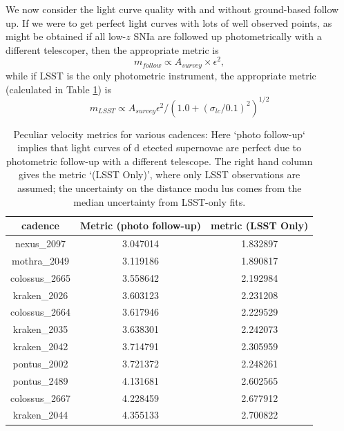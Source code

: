 \documentclass[a4paper,10pt]{article}
\begin{document}
We now consider the light curve quality with and without ground-based follow up.
If we were to get perfect light curves with lots of well observed points, as might be obtained if all low-$z$ SNIa are followed up photometrically with a different telescoper, then the appropriate metric is 
\begin{equation}
    m_{follow} \propto A_{survey} \times \epsilon^2,
\end{equation}
while if LSST is the only photometric instrument, the appropriate metric (calculated in Table \ref{tab:cadence_metrics}) is
\begin{equation}
    m_{LSST} \propto A_{survey} \epsilon^2 /(1.0 + \left(\sigma_{lc}/0.1\right)^2)^{1/2}
\end{equation}



\begin{table}
\begin{center}
\begin{tabular}{|c|c|c|}
    \hline
     cadence &  Metric (photo follow-up) &  metric (LSST Only) \\
     \hline
	nexus\_2097 & 3.047014 & 1.832897  \\
	mothra\_2049 & 3.119186 & 1.890817  \\
	colossus\_2665 & 3.558642 & 2.192984  \\
	kraken\_2026 & 3.603123 & 2.231208  \\
	colossus\_2664 & 3.617946 & 2.229529  \\	
	kraken\_2035 & 3.638301 & 2.242073  \\
	kraken\_2042 & 3.714791 & 2.305959  \\
	pontus\_2002 & 3.721372 & 2.248261  \\
	pontus\_2489 & 4.131681 & 2.602565  \\
	colossus\_2667 & 4.228459 & 2.677912  \\
	kraken\_2044 & 4.355133 & 2.700822  \\
     \hline
\end{tabular}
\end{center}
\caption{Peculiar velocity metrics for various cadences: Here `photo follow-up` implies that light curves of d
etected supernovae are perfect due to photometric follow-up with a different telescope. The right hand column 
gives the metric `(LSST Only)', where only LSST observations are assumed; the uncertainty on the distance modu
lus comes from the median uncertainty from LSST-only fits.}
\label{tab:cadence_metrics}
\end{table}
\end{document}
